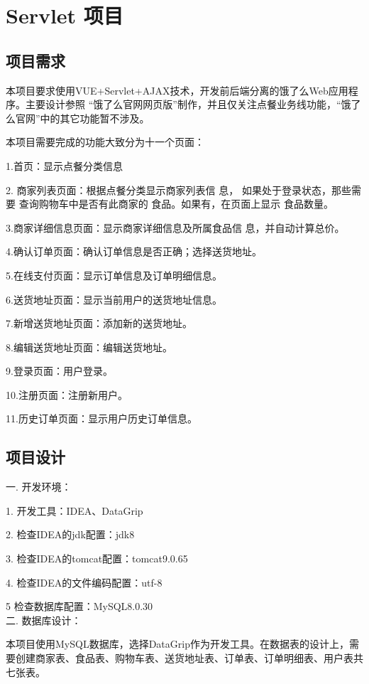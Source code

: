 
\chapter{Servlet 项目}

\section{项目需求}

本项目要求使用VUE+Servlet+AJAX技术，开发前后端分离的饿了么Web应用程序。主要设计参照 “饿了么官网网页版”制作，并且仅关注点餐业务线功能，“饿了么官网”中的其它功能暂不涉及。

本项目需要完成的功能大致分为十一个页面：

1.首页：显示点餐分类信息

2. 商家列表页面：根据点餐分类显示商家列表信
息， 如果处于登录状态，那些需要
查询购物车中是否有此商家的
食品。如果有，在页面上显示
食品数量。

3.商家详细信息页面：显示商家详细信息及所属食品信
息，并自动计算总价。

4.确认订单页面：确认订单信息是否正确；选择送货地址。

5.在线支付页面：显示订单信息及订单明细信息。

6.送货地址页面：显示当前用户的送货地址信息。

7.新增送货地址页面：添加新的送货地址。

8.编辑送货地址页面：编辑送货地址。

9.登录页面：用户登录。

10.注册页面：注册新用户。

11.历史订单页面：显示用户历史订单信息。~\\


\section{项目设计}

\noindent
一. 开发环境：

1. 开发工具：IDEA、DataGrip

2. 检查IDEA的jdk配置：jdk8

3. 检查IDEA的tomcat配置：tomcat9.0.65

4. 检查IDEA的文件编码配置：utf-8

5  检查数据库配置：MySQL8.0.30~\\

\noindent
二. 数据库设计：

本项目使用MySQL数据库，选择DataGrip作为开发工具。在数据表的设计上，需要创建商家表、食品表、购物车表、送货地址表、订单表、订单明细表、用户表共七张表。

